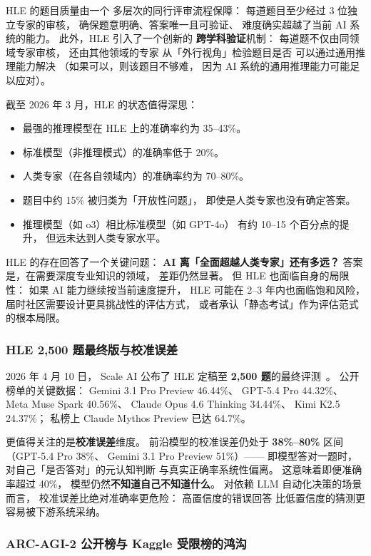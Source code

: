 HLE 的题目质量由一个
多层次的同行评审流程保障：
每道题目至少经过 3 位独立专家的审核，
确保题意明确、答案唯一且可验证、
难度确实超越了当前 AI 系统的能力。
此外，HLE 引入了一个创新的
\textbf{跨学科验证}机制：
每道题不仅由同领域专家审核，
还由其他领域的专家
从「外行视角」检验题目是否
可以通过通用推理能力解决
（如果可以，则该题目不够难，
因为 AI 系统的通用推理能力可能足以应对）。

截至 2026 年 3 月，HLE 的状态值得深思：
\begin{itemize}[noitemsep]
  \item 最强的推理模型在 HLE 上的准确率约为 35--43\%。
  \item 标准模型（非推理模式）的准确率低于 20\%。
  \item 人类专家（在各自领域内）的准确率约为 70--80\%。
  \item 题目中约 15\% 被归类为「开放性问题」，
        即使是人类专家也没有确定答案。
  \item 推理模型（如 o3）相比标准模型（如 GPT-4o）
        有约 10--15 个百分点的提升，
        但远未达到人类专家水平。
\end{itemize}

HLE 的存在回答了一个关键问题：
\textbf{AI 离「全面超越人类专家」还有多远？}
答案是，在需要深度专业知识的领域，
差距仍然显著。
但 HLE 也面临自身的局限性：
如果 AI 能力继续按当前速度提升，
HLE 可能在 2--3 年内也面临饱和风险，
届时社区需要设计更具挑战性的评估方式，
或者承认「静态考试」作为评估范式的根本局限。

\subsubsection{HLE 2,500 题最终版与校准误差}

2026 年 4 月 10 日，
Scale AI 公布了 HLE 定稿至 \textbf{2,500 题}的最终评测~\cite{hle2026final}。
公开榜单的关键数据：
Gemini 3.1 Pro Preview 46.44\%、
GPT-5.4 Pro 44.32\%、
Meta Muse Spark 40.56\%、
Claude Opus 4.6 Thinking 34.44\%、
Kimi K2.5 24.37\%；
私榜上 Claude Mythos Preview 已达 64.7\%。

更值得关注的是\textbf{校准误差}维度。
前沿模型的校准误差仍处于
\textbf{38\%--80\%} 区间（GPT-5.4 Pro 38\%、
Gemini 3.1 Pro Preview 51\%）——
即模型答对一题时，
对自己「是否答对」的元认知判断
与真实正确率系统性偏离。
这意味着即便准确率超过 40\%，
模型仍然\textbf{不知道自己不知道什么}。
对依赖 LLM 自动化决策的场景而言，
校准误差比绝对准确率更危险：
高置信度的错误回答
比低置信度的猜测更容易被下游系统采纳。

\subsubsection{ARC-AGI-2 公开榜与 Kaggle 受限榜的鸿沟}
\label{subsec:arc-agi2-gap}

